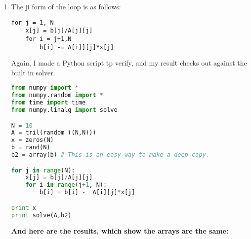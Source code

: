 \documentclass[11pt]{article}
\begin{document}
\begin{enumerate}
\begin{enumerate}
\begin{lstlisting}[language=Python]
# print x
print "Unrolled time", t1 - t0
print where(x1!=x2) # The results for rolled and unrolled are identical.
# I havent included the results comparing the x and y arrays, 
# because they differ due to rounding error. 
#(The error become large for large N).
\end{lstlisting}
\textbf{Here are the code results:}
\begin{lstlisting}
melvyn@melvyn-Satellite-C655:~$ python unroll.py
Saday Code 0.000399112701416
Python Solver 0.000165939331055
Unrolled time 0.000373125076294
(array([], dtype=int32),)
\end{lstlisting}
\item The ji form of the loop is as follows:
\begin{lstlisting}
for j = 1, N
	x[j] = b[j]/A[j][j]
	for i = j+1,N
		b[i] -= A[i]][j]*x[j]
\end{lstlisting}
Again, I made a Python script tp verify, and my result checks out against the built in solver.
\begin{lstlisting}[language=Python]
from numpy import *
from numpy.random import *
from time import time
from numpy.linalg import solve

N = 10
A = tril(random ((N,N)))
x = zeros(N)
b = rand(N)
b2 = array(b) # This is an easy way to make a deep copy.                                                                                        

for j in range(N):
    x[j] = b[j]/A[j][j]
    for i in range(j+1, N):
        b[i] = b[i] -  A[i][j]*x[j]

print x
print solve(A,b2)
\end{lstlisting}
\textbf{And here are the results, which show the arrays are the same:}
\begin{lstlisting}


\end{lstlisting}
\end{enumerate}
\end{enumerate}
\end{document}
